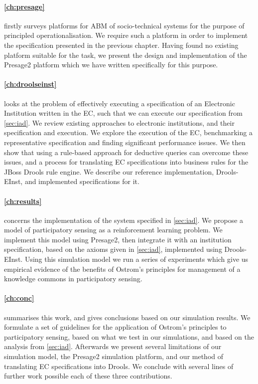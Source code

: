 \paragraph{\autoref{ch:presage}} firstly surveys platforms for \ac{ABM} of
socio-technical systems for the purpose of principled operationalisation. We
require such a platform in order to implement the specification presented in
the previous chapter. Having found no existing platform suitable for the task,
we present the design and implementation of the Presage2 platform which we
have written specifically for this purpose.

\paragraph{\autoref{ch:droolseinst}} looks at the problem of effectively
executing a specification of an Electronic Institution written in the \ac{EC},
such that we can execute our specification from \autoref{sec:iad}. We review
existing approaches to electronic institutions, and their specification and
execution. We explore the execution of the \ac{EC}, benchmarking a
representative specification and finding significant performance issues. We
then show that using a rule-based approach for deductive queries can overcome
these issues, and a process for translating \ac{EC} specifications into
business rules for the JBoss Drools rule engine. We describe our reference
implementation, Drools-EInst, and implemented specifications for it.

\paragraph{\autoref{ch:results}} concerns the implementation of the system
specified in \autoref{sec:iad}. We propose a model of participatory sensing as
a reinforcement learning problem. We implement this model using Presage2, then
integrate it with an institution specification, based on the axioms given in
\autoref{sec:iad}, implemented using Drools-EInst. Using this simulation model
we run a series of experiments which give us empirical evidence of the
benefits of Ostrom's principles for management of a knowledge commons in
participatory sensing.

\paragraph{\autoref{ch:conc}} summarises this work, and gives conclusions
based on our simulation results. We formulate a set of guidelines for the
application of Ostrom's principles to participatory sensing, based on what we
test in our simulations, and based on the analysis from \autoref{sec:iad}.
Afterwards we present several limitations of our simulation model, the
Presage2 simulation platform, and our method of translating \ac{EC}
specifications into Drools. We conclude with several lines of further work
possible each of these three contributions.

